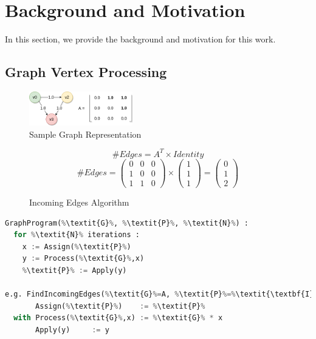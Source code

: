 \section{Background and Motivation}

In this section, we provide the background and motivation for this work.

\subsection{Graph Vertex Processing}

\begin{figure}[htbp]
\centering
\includegraphics[width=0.4\textwidth]{figures/sample_graph}
\caption{Sample Graph Representation}
\label{fig:sample_graph}
\end{figure}

\begin{figure}[ htbp ] 
\begin{equation}
\#Edges = A^{T} \times Identity
\end{equation}
\begin{equation}
\#Edges = 
\left(\begin{array}{ccc} 0 & 0 & 0 \\ 1 & 0 & 0 \\ 1 & 1 & 0 \end{array}\right) \times
\left(\begin{array}{c} 1 \\ 1 \\ 1 \end{array}\right) 
= \left(\begin{array}{c} 0 \\ 1 \\ 2 \end{array}\right) 
\end{equation}
\caption{Incoming Edges Algorithm}
\label{fig:sample_algorithm}
\end{figure} 

\begin{lstlisting}[emph={Assign, Process, Apply}, emphstyle=\color{blue}, numbers=none, escapechar=\%, language=Python, caption=GraphMath Processing Model]
GraphProgram(%\textit{G}%, %\textit{P}%, %\textit{N}%) :
  for %\textit{N}% iterations :
    x := Assign(%\textit{P}%)
  	y := Process(%\textit{G}%,x)
  	%\textit{P}% := Apply(y)	  
  
e.g. FindIncomingEdges(%\textit{G}%=A, %\textit{P}%=%\textit{\textbf{I}}%, %\textit{N}%=1) :
       Assign(%\textit{P}%)    := %\textit{P}%
  with Process(%\textit{G}%,x) := %\textit{G}% * x
       Apply(y)     := y
\end{lstlisting}

